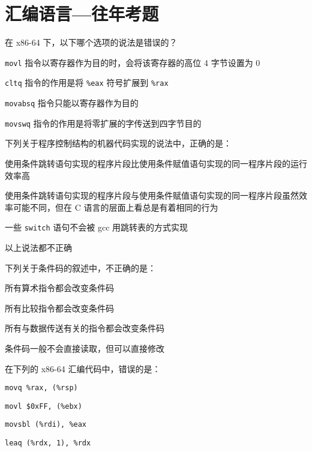 \chapter{汇编语言{---}往年考题}
    \begin{problems}
         在 x86-64 下，以下哪个选项的说法是错误的？
        \begin{choices}
            \item \verb|movl| 指令以寄存器作为目的时，会将该寄存器的高位 4 字节设置为 0
            \item \verb|cltq| 指令的作用是将 \verb|%eax| 符号扩展到 \verb|%rax|
            \item \verb|movabsq| 指令只能以寄存器作为目的
            \item \verb|movswq| 指令的作用是将零扩展的字传送到四字节目的
        \end{choices}
         下列关于程序控制结构的机器代码实现的说法中，正确的是：
        \begin{choices}
            \item 使用条件跳转语句实现的程序片段比使用条件赋值语句实现的同一程序片段的运行效率高
            \item 使用条件跳转语句实现的程序片段与使用条件赋值语句实现的同一程序片段虽然效率可能不同，但在 C 语言的层面上看总是有着相同的行为
            \item 一些 \verb|switch| 语句不会被 gcc 用跳转表的方式实现
            \item 以上说法都不正确
        \end{choices}
         下列关于条件码的叙述中，不正确的是：
        \begin{choices}
            \item 所有算术指令都会改变条件码
            \item 所有比较指令都会改变条件码
            \item 所有与数据传送有关的指令都会改变条件码
            \item 条件码一般不会直接读取，但可以直接修改
        \end{choices}
         在下列的 x86-64 汇编代码中，错误的是：
        \begin{choices}
            \item \verb|movq %rax, (%rsp)|
            \item \verb|movl $0xFF, (%ebx)|
            \item \verb|movsbl (%rdi), %eax|
            \item \verb|leaq (%rdx, 1), %rdx|

\end{choices}
\end{problems}
